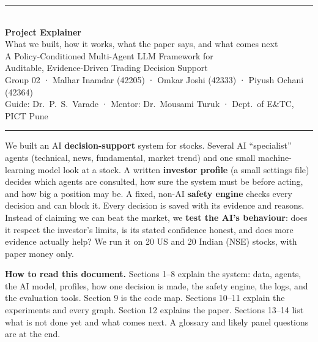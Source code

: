 \documentclass[10.5pt,a4paper]{article}
\begin{document}
\begin{center}
{\color{navy}\rule{\linewidth}{1.2pt}}\\[10pt]
{\Huge\bfseries\color{navy} Project Explainer}\\[6pt]
{\Large What we built, how it works, what the paper says, and what comes next}\\[10pt]
{\large A Policy-Conditioned Multi-Agent LLM Framework for\\ Auditable, Evidence-Driven Trading Decision Support}\\[10pt]
{\color{muted}Group 02 · Malhar Inamdar (42205) · Omkar Joshi (42333) · Piyush Ochani (42364)\\
Guide: Dr.\ P.\ S.\ Varade · Mentor: Dr.\ Mousami Turuk · Dept.\ of E\&TC, PICT Pune}\\[6pt]
{\color{navy}\rule{\linewidth}{1.2pt}}
\end{center}

\begin{onebox}[title={\bfseries The project in one paragraph},colbacktitle=navy]
We built an AI \textbf{decision-support} system for stocks. Several AI ``specialist'' agents (technical, news, fundamental, market trend) and one small machine-learning model look at a stock. A written \textbf{investor profile} (a small settings file) decides which agents are consulted, how sure the system must be before acting, and how big a position may be. A fixed, non-AI \textbf{safety engine} checks every decision and can block it. Every decision is saved with its evidence and reasons. Instead of claiming we can beat the market, we \textbf{test the AI's behaviour}: does it respect the investor's limits, is its stated confidence honest, and does more evidence actually help? We run it on 20 US and 20 Indian (NSE) stocks, with paper money only.
\end{onebox}

\textbf{How to read this document.} Sections 1--8 explain the system: data, agents, the AI model, profiles, how one decision is made, the safety engine, the logs, and the evaluation tools. Section 9 is the code map. Sections 10--11 explain the experiments and every graph. Section 12 explains the paper. Sections 13--14 list what is not done yet and what comes next. A glossary and likely panel questions are at the end.

\tableofcontents
\newpage

\end{document}
